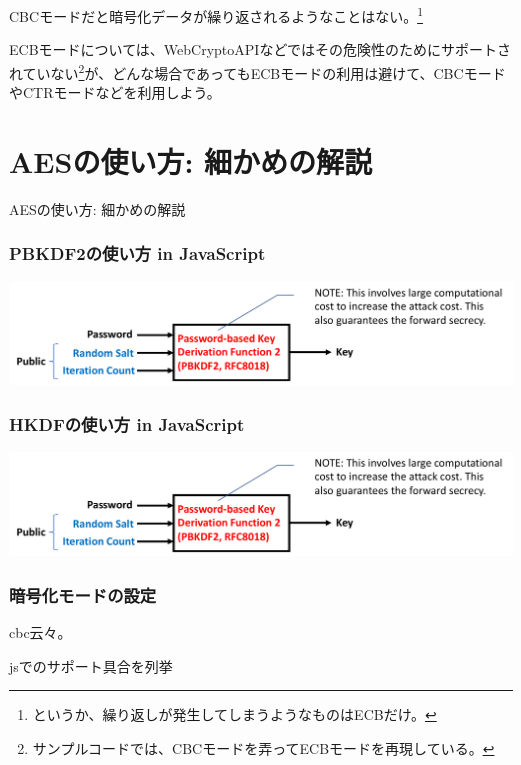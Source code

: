 \documentclass[12pt,dvipdfmx]{beamer}
\begin{document}
\begin{frame}
CBCモードだと暗号化データが繰り返されるようなことはない。\footnote[frame]{というか、繰り返しが発生してしまうようなものはECBだけ。}

\vspace{3ex}
ECBモードについては、WebCryptoAPIなどではその危険性のためにサポートされていない\footnote[frame]{サンプルコードでは、CBCモードを弄ってECBモードを再現している。}が、\alert{どんな場合であってもECBモードの利用は避けて}、CBCモードやCTRモードなどを利用しよう。
\end{frame}


\section{AESの使い方: 細かめの解説}
\begin{frame}
\centering
{\Large AESの使い方: 細かめの解説}
\end{frame}

\begin{frame}
\frametitle{PBKDF2の使い方 in JavaScript}

\begin{center}
\includegraphics[width=\linewidth]{Figs/kdf_pbkdf2_flow.pdf}
\end{center}
\end{frame}

\begin{frame}
\frametitle{HKDFの使い方 in JavaScript}
\begin{center}
\includegraphics[width=\linewidth]{Figs/kdf_pbkdf2_flow.pdf}
\end{center}
\end{frame}

\begin{frame}
\frametitle{暗号化モードの設定}
cbc云々。

jsでのサポート具合を列挙
\end{frame}
\end{document}
